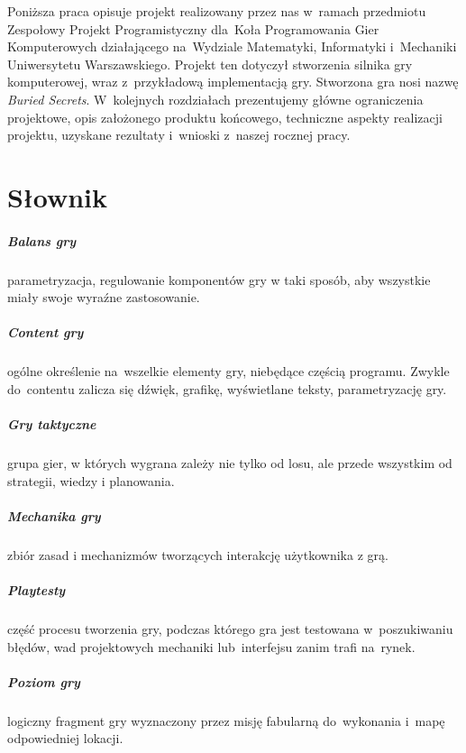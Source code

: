\documentclass[licencjacka]{pracamgr}
\begin{document}
  Poniższa praca opisuje projekt realizowany przez nas w~ramach przedmiotu Zespołowy Projekt Programistyczny dla~Koła
  Programowania Gier Komputerowych\cite{PROGRY} działającego na~Wydziale Matematyki, Informatyki i~Mechaniki Uniwersytetu
  Warszawskiego. Projekt ten dotyczył stworzenia silnika gry komputerowej, wraz z~przykładową implementacją gry.
  Stworzona gra nosi nazwę \emph{Buried Secrets}. W~kolejnych rozdziałach prezentujemy główne ograniczenia projektowe,
  opis założonego produktu końcowego, techniczne aspekty realizacji projektu, uzyskane rezultaty i~wnioski z~naszej
  rocznej pracy.

\chapter{Słownik}
  \paragraph{Balans gry}
    parametryzacja, regulowanie komponentów gry w taki sposób, aby wszystkie miały swoje wyraźne zastosowanie.
  \paragraph{Content gry}
    ogólne określenie na~wszelkie elementy gry, niebędące częścią programu. Zwykle do~contentu zalicza się dźwięk,
    grafikę, wyświetlane teksty, parametryzację gry.
  \paragraph{Gry taktyczne}
    grupa gier, w których wygrana zależy nie tylko od losu, ale przede wszystkim od strategii, wiedzy i planowania.
  \paragraph{Mechanika gry}
    zbiór zasad i mechanizmów tworzących interakcję użytkownika z grą. 
  \paragraph{Playtesty}
    część procesu tworzenia gry, podczas którego gra jest testowana w~poszukiwaniu błędów, wad projektowych mechaniki
    lub~interfejsu zanim trafi na~rynek.
  \paragraph{Poziom gry}
    logiczny fragment gry wyznaczony przez misję fabularną do~wykonania i~mapę odpowiedniej lokacji.
\end{document}
